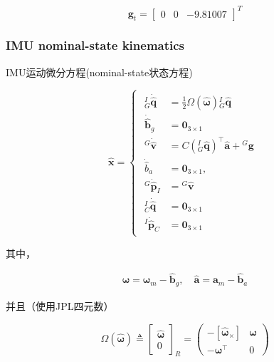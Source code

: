 \documentclass[12pt,a4paper]{article}
\begin{document}
$$
\mathbf{g}_t = \begin{bmatrix} 0 & 0 & -9.81007 \end{bmatrix}^T
$$

\subsubsection{IMU nominal-state kinematics}

IMU运动微分方程(nominal-state状态方程)~\cite{sun2018robust}

\begin{equation}
\label{equ:imu_diff_func_nominal_state}
\hat{\mathbf{x}} = 
\begin{cases}
\begin{aligned}
{}^I_G\dot{\hat{\mathbf{q}}} &= \frac{1}{2}\Omega(\hat{\boldsymbol{\omega}}) {}^I_G\hat{\mathbf{q}} \\
\dot{\hat{\mathbf{b}}}_g &= \mathbf{0}_{3\times 1} \\
{}^G\dot{\hat{\mathbf{v}}} &= C\left({}^I_G\hat{\mathbf{q}}\right)^\top \hat{\mathbf{a}} + {}^G\mathbf{g} \\
\dot{\hat{b}}_a &= \mathbf{0}_{3\times 1}, \\
{}^G\dot{\hat{\mathbf{p}}}_I &= {}^G\hat{\mathbf{v}} \\
{}^I_C\dot{\hat{\mathbf{q}}} &= \mathbf{0}_{3\times 1} \\
{}^I\dot{\hat{\mathbf{p}}}_C &= \mathbf{0}_{3\times 1}
\end{aligned}
\end{cases}
\end{equation}

其中，

\begin{equation*}
\begin{aligned}
\hat{\boldsymbol{\omega}} = \boldsymbol{\omega}_m - \hat{\mathbf{b}}_g, \quad
\hat{\mathbf{a}} = \mathbf{a}_m - \hat{\mathbf{b}}_a
\end{aligned}
\end{equation*}

并且（使用JPL四元数）

\begin{equation*}
\Omega\left(\hat{\boldsymbol{\omega}}\right) 
\triangleq 
{\begin{bmatrix}
	\hat{\boldsymbol{\omega}} \\ 0
	\end{bmatrix}}_R
= 
\begin{pmatrix}
-[\hat{\boldsymbol{\omega}}_\times] & \boldsymbol{\omega} \\
-\boldsymbol{\omega}^\top & 0
\end{pmatrix}
\end{equation*}
\end{document}

